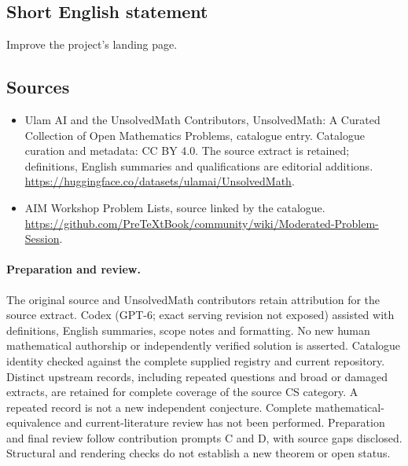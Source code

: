 \documentclass[11pt]{article}
\begin{document}
\subsection{Short English statement}
Improve the project's landing page.
\subsection{Sources}
\begin{itemize}
\item[\hypertarget{source:statement:1}{S1}] Ulam AI and the UnsolvedMath Contributors, UnsolvedMath: A Curated Collection of Open Mathematics Problems, catalogue entry. Catalogue curation and metadata: CC BY 4.0. The source extract is retained; definitions, English summaries and qualifications are editorial additions.
\url{https://huggingface.co/datasets/ulamai/UnsolvedMath}.
\item[\hypertarget{source:statement:2}{S2}] AIM Workshop Problem Lists, source linked by the catalogue.
\url{https://github.com/PreTeXtBook/community/wiki/Moderated-Problem-Session}.
\end{itemize}
\paragraph{Preparation and review.}
The original source and UnsolvedMath contributors retain attribution for the source extract. Codex (GPT-6; exact serving revision not exposed) assisted with definitions, English summaries, scope notes and formatting. No new human mathematical authorship or independently verified solution is asserted. Catalogue identity checked against the complete supplied registry and current repository. Distinct upstream records, including repeated questions and broad or damaged extracts, are retained for complete coverage of the source CS category. A repeated record is not a new independent conjecture. Complete mathematical-equivalence and current-literature review has not been performed. Preparation and final review follow contribution prompts C and D, with source gaps disclosed. Structural and rendering checks do not establish a new theorem or open status.
\label{end:statement}
\end{document}
